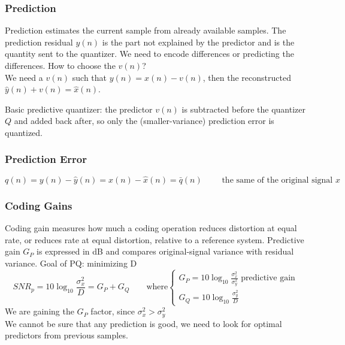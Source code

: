 \subsubsection{Prediction}
Prediction estimates the current sample from already available samples. The prediction residual $y(n)$ is the part not explained by the predictor and is the quantity sent to the quantizer.
We need to encode differences or predicting the differences. How to choose the $v(n)$?\\
We need a $v(n)$ such that $y(n) = x(n) - v(n)$, then the reconstructed $\hat{y}(n) + v(n) = \hat{x}(n)$.
\begin{center}
\end{center}
\noindent Basic predictive quantizer: the predictor $v(n)$ is subtracted before the quantizer $Q$ and added back after, so only the (smaller-variance) prediction error is quantized.
\subsubsection{Prediction Error}
$$q(n) = y(n) - \hat{y}(n) = x(n) - \hat{x}(n) = \bar{q}(n)\qquad\text{ the same of the original signal }x$$
\subsubsection{Coding Gains}
Coding gain measures how much a coding operation reduces distortion at equal rate, or reduces rate at equal distortion, relative to a reference system. Predictive gain $G_P$ is expressed in dB and compares original-signal variance with residual variance.
Goal of PQ: minimizing D
$$SNR_p = 10\log_{10}\frac{\sigma^2_x}{D} = G_P + G_Q \qquad \text{where} \begin{cases}
    G_P = 10\log_{10}\frac{\sigma_x^2}{\sigma_y^2} \text{ predictive gain}\\
    G_Q = 10\log_{10}\frac{\sigma_y^2}{D}
\end{cases}$$
We are gaining the $G_P$ factor, since $\sigma_x^2 > \sigma_y^2$\\
We cannot be sure that any prediction is good, we need to look for optimal predictors from previous samples.
